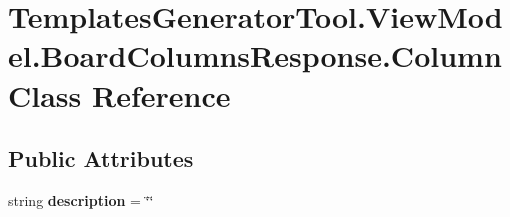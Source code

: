 \hypertarget{class_templates_generator_tool_1_1_view_model_1_1_board_columns_response_1_1_column}{}\section{Templates\+Generator\+Tool.\+View\+Model.\+Board\+Columns\+Response.\+Column Class Reference}
\label{class_templates_generator_tool_1_1_view_model_1_1_board_columns_response_1_1_column}
\subsection*{Public Attributes}
\begin{DoxyCompactItemize}
\item 
\mbox{\label{class_templates_generator_tool_1_1_view_model_1_1_board_columns_response_1_1_column_a308eca8ef85a4afe8895251d372341db}} 
string {\bfseries description} = \char`\"{}\char`\"{}
\end{DoxyCompactItemize}

